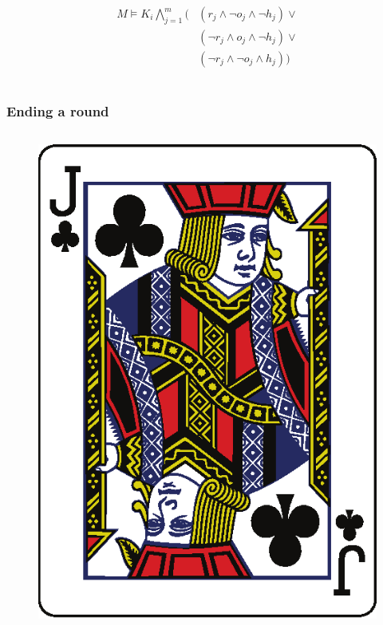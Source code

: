 \documentclass[10pt]{beamer}
\begin{document}
\begin{frame}
\begin{columns}
\begin{column}{7cm}
\begin{itemize}[label=$\clubsuit$]
    \begin{align*}
    \begin{array}{ccc}
    M \models K_i \bigwedge_{j=1}^m\bigg( &(r_j \wedge \neg o_j \wedge \neg h_j ) \vee\\
					    & (\neg r_j \wedge o_j \wedge \neg h_j) \vee\\
					    & (\neg r_j \wedge \neg o_j \wedge h_j)\bigg)
    \end{array}
    \end{align*}
    \end{itemize}
  \end{column}
 \end{columns}
\end{frame}


\begin{frame}
\frametitle{Ending a round}
 \begin{columns}
  \begin{column}{3cm}
   \begin{figure}
    \includegraphics[width=\linewidth]{im/clubs_J.eps}
   \end{figure}
  \end{column}
  

\end{columns}
\end{frame}
\end{document}
